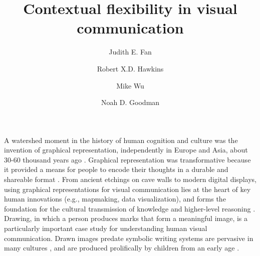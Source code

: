 \documentclass[9pt,twocolumn,twoside]{pnas-new}
\title{Contextual flexibility in visual communication}
\author[a,1]{Judith E. Fan}
\author[a]{Robert X.D. Hawkins}
\author[b]{Mike Wu}
\author[a,b]{Noah D. Goodman}
\affil[a]{Department of Psychology, Stanford University}
\affil[b]{Department of Computer Science, Stanford University}
\begin{document}
\verticaladjustment{-2pt}

\maketitle
\thispagestyle{firststyle}


A watershed moment in the history of human cognition and culture was the invention of graphical representation, independently in Europe and Asia, about 30-60 thousand years ago \cite{hoffmann2018u,Aubert:2014jy}. Graphical representation was transformative because it provided a means for people to encode their thoughts in a durable and shareable format \cite{donald1991origins}. From ancient etchings on cave walls to modern digital displays, using graphical representations for visual communication lies at the heart of key human innovations (e.g., mapmaking, data visualization), and forms the foundation for the cultural transmission of knowledge and higher-level reasoning \cite{tomasello2009cultural,card1999readings}. Drawing, in which a person produces marks that form a meaningful image, is a particularly important case study for understanding human visual communication. Drawn images predate symbolic writing systems \cite{clottes2008cave} are pervasive in many cultures \cite{gombrich1989story}, and are produced prolifically by children from an early age \cite{kellogg1969analyzing}.
\end{document}
